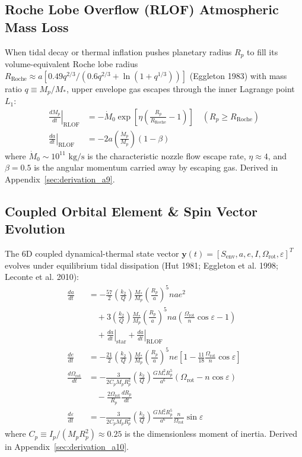 \subsection{Roche Lobe Overflow (RLOF) Atmospheric Mass Loss}
When tidal decay or thermal inflation pushes planetary radius $R_p$ to fill its volume-equivalent Roche lobe radius $R_{\mathrm{Roche}} \approx a [0.49 q^{2/3} / (0.6 q^{2/3} + \ln(1+q^{1/3}))]$ (Eggleton 1983) with mass ratio $q \equiv M_p / M_*$, upper envelope gas escapes through the inner Lagrange point $L_1$:
\begin{align}
\left.\frac{dM_p}{dt}\right|_{\mathrm{RLOF}} &= -\dot{M}_0 \exp\left[ \eta \left(\frac{R_p}{R_{\mathrm{Roche}}} - 1\right) \right] \quad (R_p \ge R_{\mathrm{Roche}}) \\
\left.\frac{da}{dt}\right|_{\mathrm{RLOF}} &= -2 a \left( \frac{\dot{M}_p}{M_p} \right) (1 - \beta)
\end{align}
where $\dot{M}_0 \sim 10^{11}\text{ kg/s}$ is the characteristic nozzle flow escape rate, $\eta \approx 4$, and $\beta = 0.5$ is the angular momentum carried away by escaping gas. Derived in Appendix~\ref{sec:derivation_a9}.

\subsection{Coupled Orbital Element \& Spin Vector Evolution}
The 6D coupled dynamical-thermal state vector $\mathbf{y}(t) = [S_{\mathrm{env}}, a, e, I, \Omega_{\mathrm{rot}}, \varepsilon]^T$ evolves under equilibrium tidal dissipation (Hut 1981; Eggleton et al. 1998; Leconte et al. 2010):
\begin{align}
\frac{da}{dt} &= -\frac{57}{2} \left(\frac{k_2}{Q}\right) \frac{M_*}{M_p} \left(\frac{R_p}{a}\right)^5 n a e^2 \nonumber \\
&\quad + 3 \left(\frac{k_2}{Q}\right) \frac{M_*}{M_p} \left(\frac{R_p}{a}\right)^5 n a \left( \frac{\Omega_{\mathrm{rot}}}{n} \cos\varepsilon - 1 \right) \nonumber \\
&\quad + \left.\frac{da}{dt}\right|_{\text{star}} + \left.\frac{da}{dt}\right|_{\mathrm{RLOF}} \\
\frac{de}{dt} &= -\frac{21}{2} \left(\frac{k_2}{Q}\right) \frac{M_*}{M_p} \left(\frac{R_p}{a}\right)^5 n e \left[ 1 - \frac{11}{18} \frac{\Omega_{\mathrm{rot}}}{n} \cos\varepsilon \right] \\
\frac{d\Omega_{\mathrm{rot}}}{dt} &= -\frac{3}{2 C_p M_p R_p^2} \left(\frac{k_2}{Q}\right) \frac{G M_*^2 R_p^5}{a^6} \left(\Omega_{\text{rot}} - n \cos\varepsilon\right) \nonumber \\
&\quad - \frac{2 \Omega_{\mathrm{rot}}}{R_p} \frac{dR_p}{dt} \\
\frac{d\varepsilon}{dt} &= -\frac{3}{2 C_p M_p R_p^2} \left(\frac{k_2}{Q}\right) \frac{G M_*^2 R_p^5}{a^6} \frac{n}{\Omega_{\mathrm{rot}}} \sin\varepsilon
\end{align}
where $C_p \equiv I_p / (M_p R_p^2) \approx 0.25$ is the dimensionless moment of inertia. Derived in Appendix~\ref{sec:derivation_a10}.

